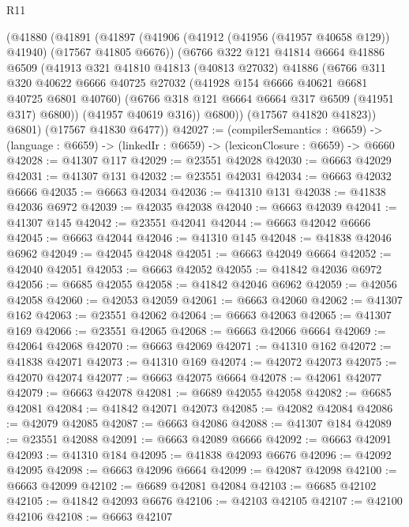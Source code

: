 \begin{lexlean}{R11}
\begin{coremodule}
      (@41880
        (@41891
          (@41897
            (@41906 (@41912 (@41956 (@41957 @40658 @129)) @41940) (@17567 @41805 @6676))
            (@6766
              @322
              @121
              @41814
              @6664
              @41886
              @6509
              (@41913
                @321
                @41810
                @41813
                (@40813 @27032)
                @41886
                (@6766
                  @311
                  @320
                  @40622
                  @6666
                  @40725
                  @27032
                  (@41928 @154 @6666 @40621 @6681 @40725 @6801 @40760)
                  (@6766 @318 @121 @6664 @6664 @317 @6509 (@41951 @317) @6800))
                (@41957 @40619 @316))
              @6800))
          (@17567 @41820 @41823))
        @6801)
      (@17567 @41830 @6477))
@42027 := (compilerSemantics : @6659) ->
  (language : @6659) -> (linkedIr : @6659) -> (lexiconClosure : @6659) -> @6660
@42028 := @41307 @117
@42029 := @23551 @42028
@42030 := @6663 @42029
@42031 := @41307 @131
@42032 := @23551 @42031
@42034 := @6663 @42032 @6666
@42035 := @6663 @42034
@42036 := @41310 @131
@42038 := @41838 @42036 @6972
@42039 := @42035 @42038
@42040 := @6663 @42039
@42041 := @41307 @145
@42042 := @23551 @42041
@42044 := @6663 @42042 @6666
@42045 := @6663 @42044
@42046 := @41310 @145
@42048 := @41838 @42046 @6962
@42049 := @42045 @42048
@42051 := @6663 @42049 @6664
@42052 := @42040 @42051
@42053 := @6663 @42052
@42055 := @41842 @42036 @6972
@42056 := @6685 @42055
@42058 := @41842 @42046 @6962
@42059 := @42056 @42058
@42060 := @42053 @42059
@42061 := @6663 @42060
@42062 := @41307 @162
@42063 := @23551 @42062
@42064 := @6663 @42063
@42065 := @41307 @169
@42066 := @23551 @42065
@42068 := @6663 @42066 @6664
@42069 := @42064 @42068
@42070 := @6663 @42069
@42071 := @41310 @162
@42072 := @41838 @42071
@42073 := @41310 @169
@42074 := @42072 @42073
@42075 := @42070 @42074
@42077 := @6663 @42075 @6664
@42078 := @42061 @42077
@42079 := @6663 @42078
@42081 := @6689 @42055 @42058
@42082 := @6685 @42081
@42084 := @41842 @42071 @42073
@42085 := @42082 @42084
@42086 := @42079 @42085
@42087 := @6663 @42086
@42088 := @41307 @184
@42089 := @23551 @42088
@42091 := @6663 @42089 @6666
@42092 := @6663 @42091
@42093 := @41310 @184
@42095 := @41838 @42093 @6676
@42096 := @42092 @42095
@42098 := @6663 @42096 @6664
@42099 := @42087 @42098
@42100 := @6663 @42099
@42102 := @6689 @42081 @42084
@42103 := @6685 @42102
@42105 := @41842 @42093 @6676
@42106 := @42103 @42105
@42107 := @42100 @42106
@42108 := @6663 @42107

\end{coremodule}
\end{lexlean}
